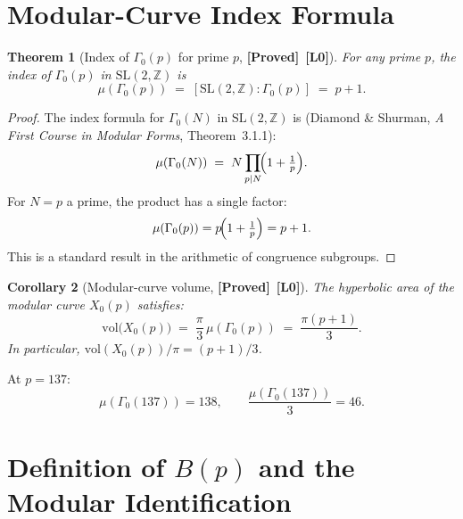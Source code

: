 \documentclass[12pt,a4paper]{article}
\newtheorem{theorem}{Theorem}[section]
\newtheorem{corollary}[theorem]{Corollary}
\theoremstyle{definition}
\theoremstyle{remark}
\newcommand{\ZZ}{\mathbb{Z}}
\newcommand{\PROVED}{\textbf{[Proved]}}
\newcommand{\Lzero}{\textbf{[L0]}}
\begin{document}
\section{Modular-Curve Index Formula}
\label{sec:mpat:index}

\begin{theorem}[Index of $\Gamma_0(p)$ for prime $p$, \PROVED\ \Lzero]
\label{thm:mpat:index}
For any prime $p$, the index of $\Gamma_0(p)$ in $\mathrm{SL}(2,\ZZ)$ is
\begin{equation}
  \mu(\Gamma_0(p))
  \;=\;
  [\mathrm{SL}(2,\ZZ) : \Gamma_0(p)]
  \;=\;
  p + 1.
  \label{eq:mpat:index}
\end{equation}
\end{theorem}

\begin{proof}
The index formula for $\Gamma_0(N)$ in $\mathrm{SL}(2,\ZZ)$ is (Diamond \&
Shurman, \emph{A First Course in Modular Forms}, Theorem~3.1.1):
\[
  \mu(\Gamma_0(N))
  \;=\;
  N \prod_{p \mid N} \!\Bigl(1 + \tfrac{1}{p}\Bigr).
\]
For $N = p$ a prime, the product has a single factor:
\[
  \mu(\Gamma_0(p))
  = p\!\Bigl(1 + \tfrac{1}{p}\Bigr)
  = p + 1.
\]
This is a standard result in the arithmetic of congruence subgroups.
\end{proof}

\begin{corollary}[Modular-curve volume, \PROVED\ \Lzero]
\label{cor:mpat:vol}
The hyperbolic area of the modular curve $X_0(p)$ satisfies:
\begin{equation}
  \mathrm{vol}\bigl(X_0(p)\bigr)
  \;=\;
  \frac{\pi}{3}\,\mu(\Gamma_0(p))
  \;=\;
  \frac{\pi(p+1)}{3}.
  \label{eq:mpat:vol}
\end{equation}
In particular, $\mathrm{vol}(X_0(p))/\pi = (p+1)/3$.
\end{corollary}

At $p = 137$:
\begin{equation}
  \mu(\Gamma_0(137)) = 138,
  \qquad
  \frac{\mu(\Gamma_0(137))}{3} = 46.
  \label{eq:mpat:137}
\end{equation}

\section{Definition of $B(p)$ and the Modular Identification}
\label{sec:mpat:Bdef}
\end{document}
